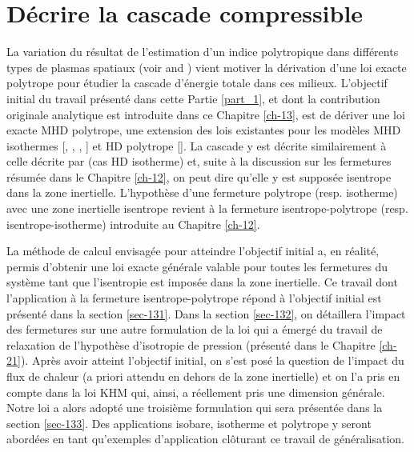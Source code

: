 \chapter{Décrire la cascade compressible}
\renewcommand\partie{\Partie\ Chapitre \thechapter}
\label{ch-13}

\minitoc  

\bigskip

La variation du résultat de l'estimation d'un indice polytropique dans différents types de plasmas spatiaux (voir  and \cite{livadiotis_thermodynamic_2018}) vient motiver la dérivation d'une loi exacte polytrope pour étudier la cascade d'énergie totale dans ces milieux. L'objectif initial du travail présenté dans cette Partie \ref{part_1}, et dont la contribution originale analytique est introduite dans ce Chapitre \ref{ch-13}, est de dériver une loi exacte \ac{MHD} polytrope, une extension des lois existantes pour les modèles \ac{MHD} isothermes [\cite{banerjee_exact_2013}, \cite{andres_alternative_2017}, \cite{andres_exact_2018}, \cite{ferrand_compact_2021}] et \ac{HD} polytrope [\cite{banerjee_kolmogorov-like_2014}]. La cascade y est décrite similairement à celle décrite par \cite{galtier_exact_2011} (cas \ac{HD} isotherme) et, suite à la discussion sur les fermetures résumée dans le Chapitre \ref{ch-12}, on peut dire qu'elle y est supposée isentrope dans la zone inertielle. L'hypothèse d'une fermeture polytrope (resp. isotherme) avec une zone inertielle isentrope revient à la fermeture \og isentrope-polytrope\fg{} (resp. isentrope-isotherme) introduite au Chapitre \ref{ch-12}.

La méthode de calcul envisagée pour atteindre l'objectif initial a, en réalité, permis d'obtenir une loi exacte générale valable pour toutes les fermetures du système tant que l'isentropie est imposée dans la zone inertielle. 
Ce travail dont l'application à la fermeture \og isentrope-polytrope \fg{} répond à l'objectif initial est présenté dans la section \ref{sec-131}. 
Dans la section \ref{sec-132}, on détaillera l'impact des fermetures sur une autre formulation de la loi qui a émergé du travail de relaxation de l'hypothèse d'isotropie de pression (présenté dans le Chapitre \ref{ch-21}). 
Après avoir atteint l'objectif initial, on s'est posé la question de l'impact du flux de chaleur (a priori attendu en dehors de la zone inertielle) et on l'a pris en compte dans la loi \acs{KHM} qui, ainsi, a réellement pris une dimension générale. Notre loi a alors adopté une troisième formulation qui sera présentée dans la section \ref{sec-133}. Des applications isobare, isotherme et polytrope y seront abordées en tant qu'exemples d'application clôturant ce travail de généralisation.

